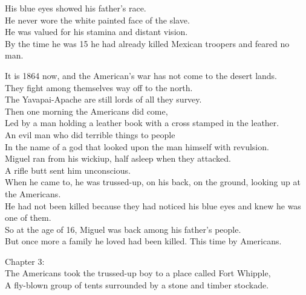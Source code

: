 His blue eyes showed his father's race. \\
He never wore the white painted face of the slave. \\
He was valued for his stamina and distant vision. \\
By the time he was 15 he had already killed Mexican troopers and feared no man. \\




It is 1864 now, and the American's war has not come to the desert lands. \\
They fight among themselves way off to the north. \\
The Yavapai-Apache are still lords of all they survey. \\
Then one morning the Americans did come, \\
Led by a man holding a leather book with a cross stamped in the leather. \\
An evil man who did terrible things to people \\
In the name of a god that looked upon the man himself with revulsion. \\

Miguel ran from his wickiup, half asleep when they attacked. \\
A rifle butt sent him unconscious. \\
When he came to, he was trussed-up, on his back, on the ground, looking up at the Americans. \\
He had not been killed because they had noticed his blue eyes and knew he was one of them. \\

So at the age of 16, Miguel was back among his father's people. \\
But once more a family he loved had been killed. This time by Americans. \\




Chapter 3: \\

The Americans took the trussed-up boy to a place called Fort Whipple, \\
A fly-blown group of tents surrounded by a stone and timber stockade. \\

